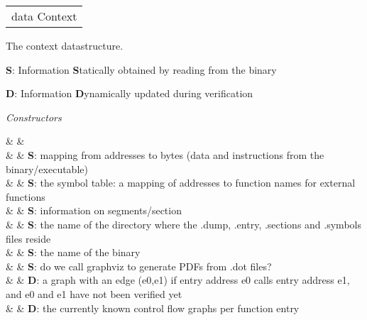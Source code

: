\begin{haddockdesc}
\item[\begin{tabular}{@{}l}
data Context
\end{tabular}]
{\haddockbegindoc
The context datastructure.\par
\textbf{S}: Information \textbf{S}tatically obtained by reading from the binary\par
\textbf{D}: Information \textbf{D}ynamically updated during verification\par
\enspace \emph{Constructors}\par
\haddockbeginconstrs
\haddockdecltt{=} &  & \\
                                              & \haddocktt{\qquad \{}  & \textbf{S}: mapping from addresses to bytes (data and instructions from the binary/executable) \\
                                              & \haddocktt{\qquad ,}  & \textbf{S}: the symbol table: a mapping of addresses to function names for external functions \\
                                              & \haddocktt{\qquad ,}  & \textbf{S}: information on segments/section \\
                                              & \haddocktt{\qquad ,}  & \textbf{S}: the name of the directory where the .dump, .entry, .sections and .symbols files reside \\
                                              & \haddocktt{\qquad ,}  & \textbf{S}: the name of the binary \\
                                              & \haddocktt{\qquad ,}  & \textbf{S}: do we call graphviz to generate PDFs from .dot files? \\
                                              & \haddocktt{\qquad ,}  & \textbf{D}: a graph with an edge (e0,e1) if entry address e0 calls entry address e1, and e0 and e1 have not been verified yet \\
                                              & \haddocktt{\qquad ,}  & \textbf{D}: the currently known control flow graphs per function entry \\
}
\end{haddockdesc}
